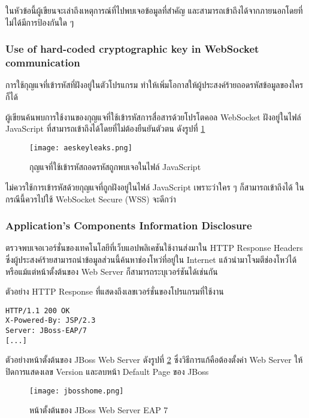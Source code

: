 ในหัวข้อนี้ผู้เขียนจะเล่าถึงเหตุการณ์ที่ไปพบเจอข้อมูลที่สำคัญ และสามารถเข้าถึงได้จากภายนอกโดยที่ไม่ได้มีการป้องกันใด ๆ
 
 
\subsubsection{Use of hard-coded cryptographic key in WebSocket communication}

การใช้กุญแจที่เข้ารหัสที่ฝังอยู่ในตัวโปรแกรม ทำให้เพิ่มโอกาสให้ผู้ประสงค์ร้ายถอดรหัสข้อมูลของใครก็ได้

ผู้เขียนค้นพบการใช้งานของกุญแจที่ใช้เข้ารหัสการสื่อสารด้วยโปรโตคอล WebSocket ฝังอยู่ในไฟล์ JavaScript ที่สามารถเข้าถึงได้โดยที่ไม่ต้องยืนยันตัวตน ดังรูปที่ \ref{Fig:aeskeyleaks.png}

 \begin{figure}[h]
	\centering
	\texttt{[image: aeskeyleaks.png]}
	\caption{กุญแจที่ใช้เข้ารหัสถอดรหัสถูกพบเจอในไฟล์ JavaScript}
	\label{Fig:aeskeyleaks.png}
\end{figure}
 
 ไม่ควรใช้การเข้ารหัสด้วยกุญแจที่ถูกฝังอยู่ในไฟล์ JavaScript เพราะว่าใคร ๆ ก็สามารถเข้าถึงได้ ในกรณีนี้ควรไปใช้ WebSocket Secure (WSS) จะดีกว่า
 
 \subsubsection{Application's Components Information Disclosure}
 
 ตรวจพบเจอเวอร์ชั่นของเทคโนโลยีที่เว็บแอปพลิเคชันใช้งานส่งมาใน HTTP Response Headers ซึ่งผู้ประสงค์ร้ายสามารถนำข้อมูลส่วนนี้ค้นหาช่องโหว่ที่อยู่ใน Internet แล้วนำมาโจมตีช่องโหว่ได้ หรือแม้แต่หน้าตั้งต้นของ Web Server ก็สามารถระบุเวอร์ชันได้เช่นกัน
 
 ตัวอย่าง HTTP Response ที่แสดงถึงเลขเวอร์ชั่นของโปรแกรมที่ใช้งาน
 
\begin{lstlisting}[numbers=none] 
HTTP/1.1 200 OK
X-Powered-By: JSP/2.3
Server: JBoss-EAP/7
[...]
\end{lstlisting}
 
ตัวอย่างหน้าตั้งต้นของ JBoss Web Server ดังรูปที่ \ref{Fig:jbosshome.png} ซึ่งวิธีการแก้คือต้องตั้งค่า Web Server ให้ปิดการแสดงเลข Version และลบหน้า Default Page ของ JBoss

 \begin{figure}[h]
	\centering
	\texttt{[image: jbosshome.png]}
	\caption{หน้าตั้งต้นของ JBoss Web Server EAP 7}
	\label{Fig:jbosshome.png}
\end{figure}

